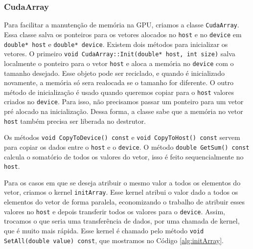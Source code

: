 \subsubsection{CudaArray}
Para facilitar a manutenção de memória na GPU, criamos a classe \texttt{CudaArray}. Essa classe salva os ponteiros para os vetores alocados no \texttt{host} e no \texttt{device} em \texttt{double* host} e \texttt{double* device}. 
Existem dois métodos para inicializar os vetores. O primeiro \texttt{void CudaArray::Init(double* host, int size)} salva localmente o ponteiro para o vetor \texttt{host} e aloca a memória no \texttt{device} com o tamanho desejado. Esse objeto pode ser reciclado, e quando é inicializado novamente, a memória só sera realocada se o tamanho for diferente. 
O outro método de inicialização é usado quando queremos copiar para o \texttt{host} valores criados no \texttt{device}. Para isso, não precisamos passar um ponteiro para um vetor pré alocado na inicialização. Dessa forma, a classe sabe que a memória no vetor \texttt{host} também precisa ser liberada no destrutor.

Os métodos \texttt{void CopyToDevice() const} e \texttt{void CopyToHost() const} servem para copiar os dados entre o \texttt{host} e o \texttt{device}.
O método \texttt{double GetSum() const} calcula o somatório de todos os valores do vetor, isso é feito sequencialmente no \texttt{host}. %

Para os casos em que se deseja atribuir o mesmo valor a todos os elementos do vetor, criamos o kernel \texttt{initArray}. Esse kernel atribui o valor dado a todos os elementos do vetor de forma paralela, %
economizando o trabalho de atribuir esses valores no \texttt{host} e depois transferir todos os valores para o \texttt{device}. Assim, trocamos o que seria uma transferência de dados, por uma chamada de kernel, que é muito mais rápida. Esse kernel é chamado pelo método \texttt{void SetAll(double value) const}, que mostramos no Código \ref{alg:initArray}.


